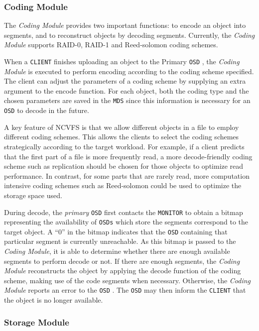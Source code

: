 \documentclass{article}
\def\osd{\texttt{OSD} }
\def\osds{\texttt{OSDs} }
\def\mds{\texttt{MDS} }
\def\client{\texttt{CLIENT} }
\def\monitor{\texttt{MONITOR} }
\begin{document}
\subsubsection{Coding Module}

The \textit{Coding Module} provides two important functions: to encode an object
into segments, and to reconstruct objects by decoding segments. 
Currently, the \textit{Coding Module} supports RAID-0, RAID-1 and Reed-solomon coding schemes.

When a \client finishes uploading an object to the Primary \osd, the \textit{Coding Module} is 
executed to perform encoding according to the coding scheme specified. The client
can adjust the parameters of a coding scheme by supplying an extra argument 
to the encode function. For each object, both the coding type and the 
chosen parameters are saved in the \mds since this information is necessary for an \osd
to decode in the future.

A key feature of NCVFS is that we allow different objects in a file to employ different 
coding schemes. This allows the clients to select the coding schemes strategically 
according to the target workload. For example, if a client predicts that the first part 
of a file is more frequently read, a more decode-friendly coding scheme such as replication
should be chosen for those objects to optimize read performance. 
In contrast, for some parts that are rarely read, more computation intensive 
coding schemes such as Reed-solomon could be used to optimize the storage space used.

During decode, the \textit{primary} \osd first contacts the \monitor to obtain a
bitmap representing the availability of \osds which store the segments 
correspond to the target object. A ``0'' in the bitmap indicates that the \osd
containing that particular segment is currently unreachable. As this bitmap is passed
to the \textit{Coding Module}, it is able to determine whether there are enough available
segments to perform decode or not. If there are enough segments, the \textit{Coding Module}
reconstructs the object by applying the decode function of the coding
scheme, making use of the code segments when necessary. Otherwise, the \textit{Coding Module}
reports an error to the \osd . The \osd may then inform the \client
that the object is no longer available.

\subsubsection{Storage Module}
\end{document}
